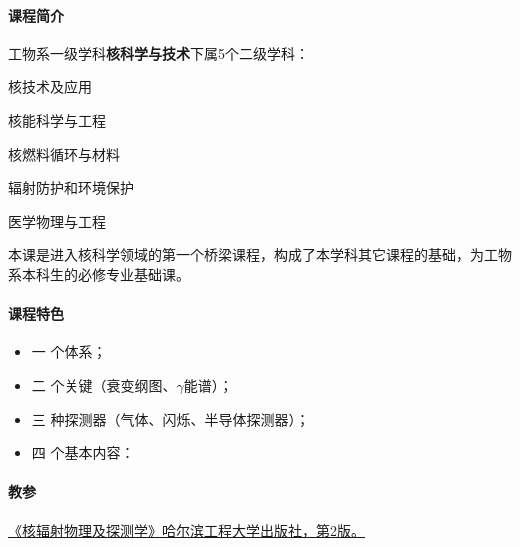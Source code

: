 \preface

\paragraph{课程简介}
工物系一级学科\textbf{核科学与技术}下属5个二级学科：
\begin{compactitem}
	\item 核技术及应用
	\item 核能科学与工程
	\item 核燃料循环与材料
	\item 辐射防护和环境保护
	\item 医学物理与工程
\end{compactitem}
本课是进入核科学领域的第一个桥梁课程，构成了本学科其它课程的基础，为工物系本科生的必修专业基础课。

\paragraph{课程特色}
\begin{itemize}
	\item 一 个体系；
	\item 二 个关键（衰变纲图、$\gamma$能谱）；
	\item 三 种探测器（气体、闪烁、半导体探测器）；
	\item 四 个基本内容：
\end{itemize}

\paragraph{教参}
\href{http://reserves.lib.tsinghua.edu.cn/Search/BookDetail?bookId=bcac7c78-bf4c-4bfd-9ecc-f1b6f47e6b10}{《核辐射物理及探测学》哈尔滨工程大学出版社，第2版。}

